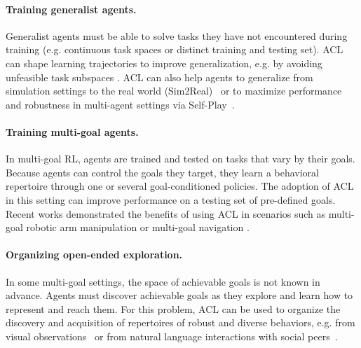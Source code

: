 \documentclass{article}
\begin{document}
\paragraph{Training generalist agents.} Generalist agents must be able to solve tasks they have not encountered during training (e.g. continuous task spaces or distinct training and testing set). ACL can shape learning trajectories to improve generalization, e.g. by avoiding unfeasible task subspaces \cite{portelas2019}. ACL can also help agents to generalize from simulation settings to the real world (Sim2Real)~\cite{OpenAI2019SolvingRC,ADRmila} or to maximize performance and robustness in multi-agent settings via Self-Play~\cite{alpha-go-zero,rarl,openaiSumos,Baker2019HidenSeek,vinyals2019grandmaster}.

\paragraph{Training multi-goal agents.}In multi-goal RL, agents are trained and tested on tasks that vary by their goals. Because agents can control the goals they target, they learn a behavioral repertoire through one or several goal-conditioned policies. The adoption of ACL in this setting can improve performance on a testing set of pre-defined goals. Recent works demonstrated the benefits of using ACL in scenarios such as multi-goal robotic arm manipulation \cite{her,eb-per,fournier-accuracy-acl,CGM,zhao2019curiosity,curriculu-her,curious} or multi-goal navigation \cite{asymetricSP,goalgan,settersolver,cideron2019self}.

\paragraph{Organizing open-ended exploration.}In some multi-goal settings, the space of achievable goals is not known in advance. Agents must discover achievable goals as they explore and learn how to represent and reach them. For this problem, ACL can be used to organize the discovery and acquisition of repertoires of robust and diverse behaviors, e.g. from visual observations~\cite{diayn,skewfit,metarl-carml} or from natural language interactions with social peers~\cite{le2,imagine}.
\end{document}
